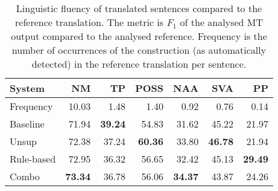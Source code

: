 \documentclass[free]{flammie}
\begin{document}

\begin{table}
\scriptsize{
\centering
\begin{tabular}{lrrrrrr}
\hline
\bf System & \bf NM & \bf TP  & \bf POSS& \bf NAA& \bf SVA& \bf PP   \\
\hline
Frequency & 10.03 & 1.48 & 1.40 & 0.92 & 0.76 & 0.14 \\
\hline
Baseline & 71.94   & \bf 39.24 & 54.83    & 31.62   & 45.22    & 21.97  \\
Unsup & 72.38      & 37.24    & \bf 60.36 & 33.80   & \bf 46.78 & 21.94 \\
Rule-based & 72.95 & 36.32    & 56.65    & 32.42    & 45.13   & \bf 29.49 \\
Combo & \bf 73.34  & 36.78    & 56.06    & \bf 34.37 & 43.87  & 24.26  \\
\hline
\end{tabular}
\caption{Linguistic fluency of translated sentences compared to the reference translation. The metric is $F_1$ of the analysed MT output compared to the analysed reference.
Frequency is the number of occurrences of the construction (as automatically detected) in the reference translation per sentence.\label{table:error-analysis}}
}
\end{table}

\end{document}
